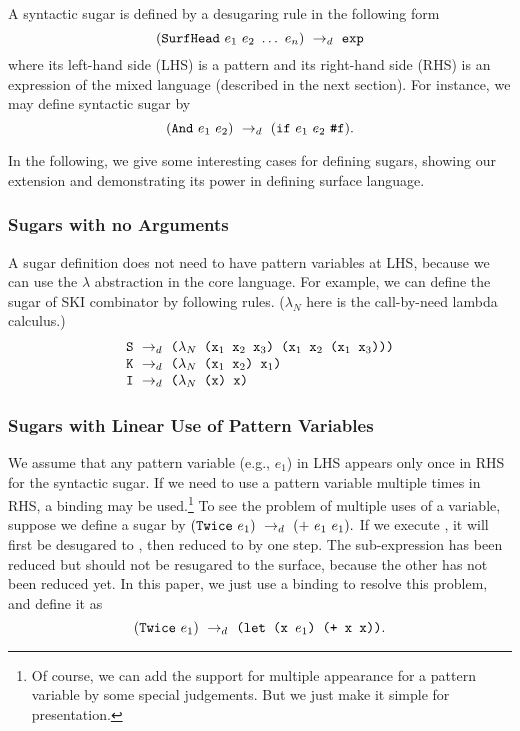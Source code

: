 A syntactic sugar  is defined by a desugaring rule in the following form
\[
\drule{(\m{SurfHead}~e_1~e_2~\ldots~e_n)}{\m{exp}} %
\]
where its left-hand side (LHS) is a pattern and its right-hand side (RHS) is an expression of the mixed language (described in the next section).
For instance, we may define syntactic sugar  by
\[
(\mbox{\tt And}~e_1~e_2) ~\rightarrow_d~ (\mbox{\tt if}~e_1~e_2~\mbox{\tt \#f}).
\]

In the following, we give some interesting cases for defining sugars, showing our extension and demonstrating its power in defining surface language.

\subsubsection{Sugars with no Arguments}
A sugar definition does not need to have pattern variables at LHS, because we can use the $\lambda$ abstraction in the core language. For example, we can define the sugar of SKI combinator by following rules. ($\lambda_N$ here is the call-by-need lambda calculus.)
\[
\begin{array}{l}
\mbox{\tt S} ~\rightarrow_d~ \texttt{($\lambda_N$ ($\mbox{\tt x}_1$ $\mbox{\tt x}_2$ $\mbox{\tt x}_3$) ($\mbox{\tt x}_1$ $\mbox{\tt x}_2$ ($\mbox{\tt x}_1$ $\mbox{\tt x}_3$)))}\\
\mbox{\tt K} ~\rightarrow_d~ \texttt{($\lambda_N$ ($\mbox{\tt x}_1$ $\mbox{\tt x}_2$) $\mbox{\tt x}_1$)}\\
\mbox{\tt I} ~\rightarrow_d~ \texttt{($\lambda_N$ (x) x)}
\end{array}
\]

\subsubsection{Sugars with Linear Use of Pattern Variables}
We assume that any pattern variable (e.g., $e_1$) in LHS appears only once in RHS for the syntactic sugar.
If we need to use a pattern variable multiple times in RHS, a  binding may be used.\footnote{Of course, we can add the support for multiple appearance for a pattern variable by some special judgements. But we just make it simple for presentation.} To see the problem of multiple uses of a variable, suppose we define a sugar by
$
(\mbox{\tt Twice}~e_1) ~\rightarrow_d~ (+~e_1~e_1).
$
If we execute , it will first be desugared to , then reduced to  by one step. The sub-expression  has been reduced but should not be resugared to the surface, because the other  has not been reduced yet.
In this paper, we just use a  binding to resolve this problem, and define it as
\[
(\mbox{\tt Twice}~e_1) ~\rightarrow_d~ \texttt{(let (x $e_1$) (+ x x))}.
\]

